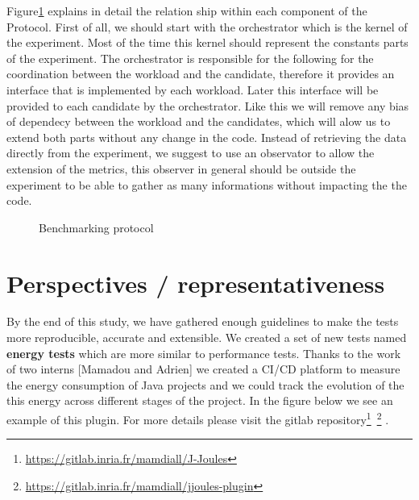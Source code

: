 Figure\ref{fig:benchmarkingprotocol} explains in detail the relation ship within each component of the Protocol. 
First of all, we should start with the orchestrator which is the kernel of the experiment. Most of the time this kernel should represent the constants parts of the experiment. 
The orchestrator is responsible for the following  for the coordination between the workload and the candidate, therefore it provides an interface that is implemented by each workload. 
Later this interface will be provided to each candidate by the orchestrator. Like this we will remove any bias of dependecy between the workload and the candidates, which will alow us to extend both parts without any change in the code. 
Instead of retrieving the data directly from the experiment, we suggest to use an observator to allow the extension of the metrics, this observer in general should be outside the experiment to be able to gather as many informations without impacting the the code.  
\begin{figure}[!htb]
    \caption{Benchmarking protocol}\label{fig:benchmarkingprotocol}
\end{figure}



\section{Perspectives / representativeness}
By the end of this study, we have gathered enough guidelines to make the tests more reproducible, accurate and extensible.
We created a set of new tests named \textbf{energy tests} which are more similar to performance tests.
Thanks to the work of two interns [Mamadou and Adrien] we created a CI/CD platform to measure the energy consumption of Java projects and we could track the evolution of the this energy across different stages of the project.
In the figure below we see an example of this plugin.
For more details please visit the gitlab repository\footnote{\url{https://gitlab.inria.fr/mamdiall/J-Joules}}~\footnote{\url{https://gitlab.inria.fr/mamdiall/jjoules-plugin}} .


